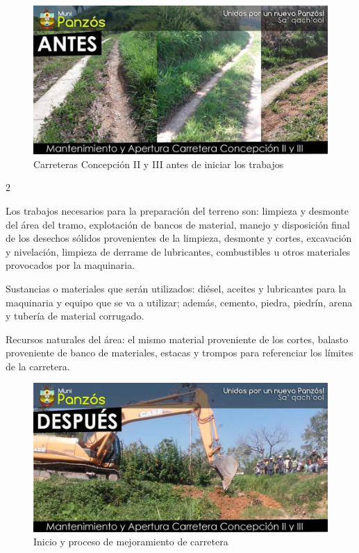 \documentclass[12pt,spanish,Letterpaper,openany]{book}
\newcommand{\spacefourmilis}{\vspace{4mm}}
\newcommand{\spacetwomilis}{\vspace{2mm}}
\begin{document}
\begin{figure}[H]

{\centering \includegraphics[width=0.8\linewidth]{images/image03_mgarcia} 

}

\caption{Carreteras Concepción II y III antes de iniciar los trabajos}\label{fig:unnamed-chunk-17}
\end{figure}

\begin {multicols}{2}

\spacetwomilis

Los trabajos necesarios para la preparación del terreno son: limpieza y desmonte del área del tramo, explotación de bancos de material, manejo y disposición final de los desechos sólidos provenientes de la limpieza, desmonte y cortes, excavación y nivelación, limpieza de derrame de lubricantes, combustibles u otros materiales provocados por la maquinaria.

\spacefourmilis

Sustancias o materiales que serán utilizados: diésel, aceites y lubricantes para la maquinaria y equipo que se va a utilizar; además, cemento, piedra, piedrín, arena y tubería de material corrugado.

Recursos naturales del área: el mismo material proveniente de los cortes, balasto proveniente de banco de materiales, estacas y trompos para referenciar los límites de la carretera.

\end {multicols}

\begin{figure}[H]

{\centering \includegraphics[width=0.7\linewidth]{images/image04_mgarcia} 

}

\caption{Inicio y proceso de mejoramiento de carretera}\label{fig:unnamed-chunk-18}
\end{figure}
\end{document}
